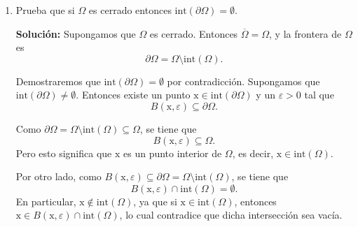 \documentclass[12pt]{article}
\newcommand{\Int}{\mathrm{int}}
\newcommand{\N}{\mathbb N}
\newcommand{\R}{\mathbb R}
\newcommand{\x}{\mathrm x}
\begin{document}
\begin{enumerate}
\begin{itemize}
    \item \textbf{Caso 1:} $x_0 > y_0^2$. Entonces $(x_0, y_0) \in \Omega$, y por lo tanto $(x_0, y_0) \in \overline{\Omega}$.
    
    \item \textbf{Caso 2:} $x_0 = y_0^2$. Entonces $(x_0, y_0)$ está sobre la parábola. Debemos demostrar que es un punto de acumulación de $\Omega$. Para ello, construiremos una sucesión de puntos en $\Omega$ que converja a $(x_0, y_0)$.
    
    Para cada $k \in \N$, definimos
    \[
    (x_k, y_k) = \left(x_0 + \frac{1}{k}, y_0\right).
    \]
    Observamos que
    \[
    x_k = x_0 + \frac{1}{k} = y_0^2 + \frac{1}{k} > y_0^2 = y_k^2,
    \]
    por lo que $(x_k, y_k) \in \Omega$ para toda $k \in \N$. Además,
    \[
    \lim_{k \to \infty} (x_k, y_k) = \lim_{k \to \infty} \left(x_0 + \frac{1}{k}, y_0\right) = (x_0, y_0).
    \]
    Por lo tanto, $(x_0, y_0)$ es un punto de acumulación de $\Omega$, y así $(x_0, y_0) \in \overline{\Omega}$.
\end{itemize}

En ambos casos, $(x_0, y_0) \in \overline{\Omega}$, lo que demuestra que
\[
\{ (x,y)\in \R^2 : x \geq y^2 \} \subseteq \overline{\Omega}.
\]

Combinando ambas contenciones, concluimos que
\[
\overline{\Omega} = \{ (x,y)\in \R^2 : x \geq y^2 \}.
\]

\item Prueba que si $\Omega$ es cerrado entonces 
$\Int(\partial \Omega)=\emptyset$.

\textbf{Solución: }
Supongamos que $\Omega$ es cerrado. Entonces $\overline{\Omega} = \Omega$, y la frontera de $\Omega$ es
\[
\partial \Omega = \Omega \setminus \Int(\Omega).
\]

Demostraremos que $\Int(\partial \Omega) = \emptyset$ por contradicción.
Supongamos que $\Int(\partial \Omega) \neq \emptyset$. Entonces existe un punto $\x \in \Int(\partial \Omega)$ y un $\varepsilon > 0$ tal que
\[
B(\x, \varepsilon) \subseteq \partial \Omega.
\]

Como $\partial \Omega = \Omega \setminus \Int(\Omega) \subseteq \Omega$, se tiene que
\[
B(\x, \varepsilon) \subseteq \Omega.
\]
Pero esto significa que $\x$ es un punto interior de $\Omega$, es decir, $\x \in \Int(\Omega)$.

Por otro lado, como $B(\x, \varepsilon) \subseteq \partial \Omega = \Omega \setminus \Int(\Omega)$, se tiene que
\[
B(\x, \varepsilon) \cap \Int(\Omega) = \emptyset.
\]
En particular, $\x \notin \Int(\Omega)$, ya que si $\x \in \Int(\Omega)$, entonces $\x \in B(\x, \varepsilon) \cap \Int(\Omega)$, lo cual contradice que dicha intersección sea vacía.


\end{enumerate}
\end{document}

